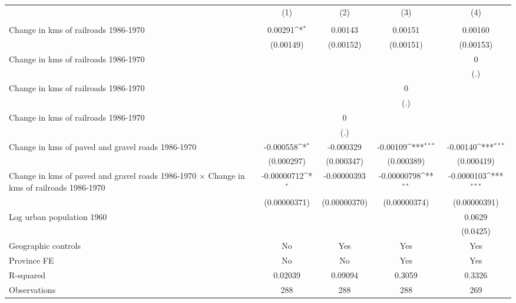 {
\def\sym#1{\ifmmode^{#1}\else\(^{#1}\)\fi}
\begin{tabular}{l*{4}{c}}
\hline\hline
                &\multicolumn{1}{c}{(1)}&\multicolumn{1}{c}{(2)}&\multicolumn{1}{c}{(3)}&\multicolumn{1}{c}{(4)}\\
                &\multicolumn{1}{c}{}&\multicolumn{1}{c}{}&\multicolumn{1}{c}{}&\multicolumn{1}{c}{}\\
\hline
Change in kms of railroads 1986-1970&  0.00291\sym{*}  &  0.00143         &  0.00151         &  0.00160         \\
                &(0.00149)         &(0.00152)         &(0.00151)         &(0.00153)         \\
[1em]
Change in kms of railroads 1986-1970&                  &                  &                  &        0         \\
                &                  &                  &                  &      (.)         \\
[1em]
Change in kms of railroads 1986-1970&                  &                  &        0         &                  \\
                &                  &                  &      (.)         &                  \\
[1em]
Change in kms of railroads 1986-1970&                  &        0         &                  &                  \\
                &                  &      (.)         &                  &                  \\
[1em]
Change in kms of paved and gravel roads 1986-1970&-0.000558\sym{*}  &-0.000329         & -0.00109\sym{***}& -0.00140\sym{***}\\
                &(0.000297)         &(0.000347)         &(0.000389)         &(0.000419)         \\
[1em]
Change in kms of paved and gravel roads 1986-1970 $\times$ Change in kms of railroads 1986-1970&-0.00000712\sym{*}  &-0.00000393         &-0.00000798\sym{**} &-0.0000103\sym{***}\\
                &(0.00000371)         &(0.00000370)         &(0.00000374)         &(0.00000391)         \\
[1em]
Log urban population 1960&                  &                  &                  &   0.0629         \\
                &                  &                  &                  & (0.0425)         \\
\hline
Geographic controls&       No         &      Yes         &      Yes         &      Yes         \\
Province FE     &       No         &       No         &      Yes         &      Yes         \\
R-squared       &  0.02039         &  0.09094         &   0.3059         &   0.3326         \\
Observations    &      288         &      288         &      288         &      269         \\
\hline\hline
\end{tabular}
}
